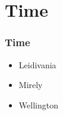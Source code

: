\section{Time}
\begin{frame}
    \frametitle{Time}
    \begin{itemize}
        \item Leidivania
        \item Mirely
        \item Wellington
    \end{itemize}
\end{frame}